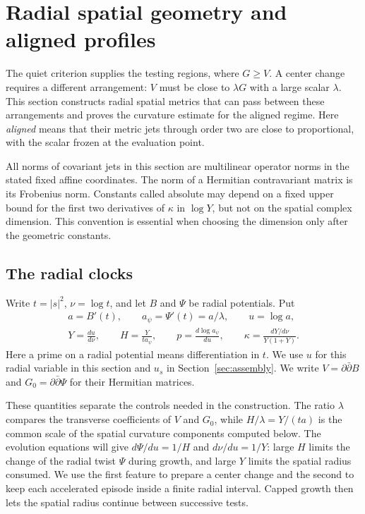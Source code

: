 \section{Radial spatial geometry and aligned profiles}\label{sec:radial}

The quiet criterion supplies the testing regions, where $G\ge V$.
A center change requires a different arrangement: $V$ must be close to
$\lambda G$ with a large scalar $\lambda$. This section constructs radial
spatial metrics that can pass between these arrangements and proves the
curvature estimate for the aligned regime. Here \emph{aligned} means
that their metric jets through order two are close to proportional,
with the scalar frozen at the evaluation point.

All norms of covariant jets in this section are multilinear operator norms in the stated fixed affine coordinates. The norm of a Hermitian contravariant matrix is its Frobenius norm. Constants called absolute may depend on a fixed upper bound for the first two derivatives of $\kappa$ in $\log Y$, but not on the spatial complex dimension. This convention is essential when choosing the dimension only after the geometric constants.

\subsection{The radial clocks}

Write $t=|s|^2$, $\nu=\log t$, and let $B$ and $\Psi$ be radial potentials. Put
\begin{equation}\label{radial:definitions}
 \begin{gathered}
 a=B'(t),\qquad a_\psi=\Psi'(t)=a/\lambda,\qquad
 u=\log a,\\
 Y=\frac{du}{d\nu},\qquad
 H=\frac{Y}{t a_\psi},\qquad
 p=\frac{d\log a_\psi}{du},\qquad
 \kappa=\frac{dY/d\nu}{Y(1+Y)}.
 \end{gathered}
\end{equation}
Here a prime on a radial potential means differentiation in $t$. We use $u$ for this radial variable in this section and $u_s$ in Section~\ref{sec:assembly}. We write $V=\partial\bar\partial B$ and $G_0=\partial\bar\partial\Psi$ for their Hermitian matrices.

These quantities separate the controls needed in the construction.
The ratio $\lambda$ compares the transverse coefficients of $V$ and
$G_0$, while $H/\lambda=Y/(ta)$ is the common scale of the spatial
curvature components computed below. The evolution equations will give
$d\Psi/du=1/H$ and $d\nu/du=1/Y$: large $H$ limits the change of the
radial twist $\Psi$ during growth, and large $Y$ limits the spatial radius consumed.
We use the first feature to prepare a center change and the second to
keep each accelerated episode inside a finite radial interval. Capped
growth then lets the spatial radius continue between successive tests.

